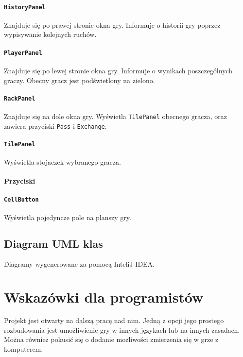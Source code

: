 \documentclass[a4paper]{article}
\begin{document}
\paragraph{\texttt{HistoryPanel}} Znajduje się po prawej stronie okna gry. Informuje o historii gry poprzez wypisywanie kolejnych ruchów.
\paragraph{\texttt{PlayerPanel}} Znajduje się po lewej stronie okna gry. Informuje o wynikach poszczególnych graczy. Obecny gracz jest podświetlony na zielono.
\paragraph{\texttt{RackPanel}} Znajduje się na dole okna gry. Wyświetla \texttt{TilePanel} obecnego gracza, oraz zawiera przyciski \texttt{Pass} i \texttt{Exchange}.
\paragraph{\texttt{TilePanel}} Wyświetla stojaczek wybranego gracza.
\paragraph{Przyciski}
\paragraph{\texttt{CellButton}} Wyświetla pojedyncze pole na planszy gry.
\subsection{Diagram UML klas}
Diagramy wygenerowane za pomocą InteliJ IDEA.
\section{Wskazówki dla programistów}
Projekt jest otwarty na dalszą pracę nad nim. Jedną z opcji jego prostego rozbudowania jest umożliwienie gry w innych językach lub na innych zasadach. Można również pokusić się o dodanie możliwości zmierzenia się w grze z komputerem.
\end{document}
